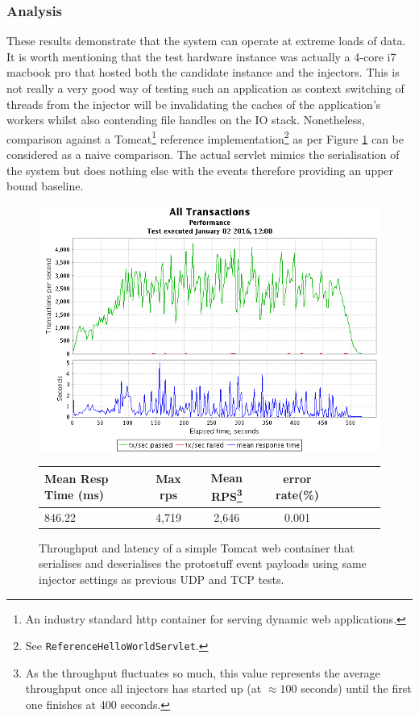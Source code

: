 \documentclass[a4paper,11pt]{scrreprt}
\begin{document}
\subsubsection{Analysis}
These results demonstrate that the system can operate at extreme loads of data. It is worth mentioning that the test hardware instance was actually a 4-core i7 macbook pro that hosted both the candidate instance and the injectors. This is not really a very good way of testing such an application as context switching of threads from the injector will be invalidating the caches of the application's workers whilst also contending file handles on the IO stack. Nonetheless, comparison against a Tomcat\footnote{An industry standard http container for serving dynamic web applications.} reference implementation\footnote{See \verb|ReferenceHelloWorldServlet|.} as per Figure \ref{fig:tomcatthroughput} can be considered as a naive comparison. The actual servlet mimics the serialisation of the system but does nothing else with the events therefore providing an upper bound baseline. 

\begin{figure}[h!]
\centering
\caption{Throughput and latency of a simple Tomcat web container that serialises and deserialises the protostuff event payloads using same injector settings as previous UDP and TCP tests.}
\includegraphics[scale=0.6, trim=0 -25 0 2, clip=true] {TomcatThroughput.png}
\label{fig:tomcatthroughput}
\begin{tabular}{l*{6}{c}r}
Mean Resp Time (ms) & Max \acrshort{rps} & Mean RPS\footnote{As the throughput fluctuates so much, this value represents the average throughput once all injectors has started up (at \(\approx100\) seconds) until the first one finishes at 400 seconds.} & error rate(\%)\\
\hline
846.22 & 4,719 & 2,646 & 0.001
\end{tabular}
\end{figure}
\end{document}
